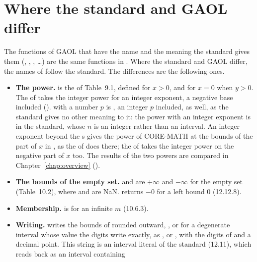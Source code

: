 \section{Where the standard and GAOL differ}\label{sec:ieee1788-differences}
%

The functions of GAOL that have the name and the meaning the standard gives
them (, , , \ldots) are the same
functions in . Where the standard and GAOL differ, the
names of  follow the standard. The differences are the
following ones.

\begin{itemize}
\item[$\bullet$] \textbf{The power.}  is the  of
  Table~9.1, defined for $x>0$, and for $x=0$ when $y>0$. The  of
   takes the integer power for an integer exponent, a negative
  base included ().  with a number $p$ is
  , an integer $p$ included,  as well, as
  the standard gives no other meaning to it: the power with an integer
  exponent is  in the standard, whose $n$ is an integer
  rather than an interval. An integer exponent beyond the s gives
  the power of CORE-MATH at the bounds of the part of $x$ in
  , as the  of  does there; the 
  of  takes the integer power on the negative part of $x$ too. The results of the two powers are
  compared in Chapter~\ref{chap:overview} ().
\item[$\bullet$] \textbf{The bounds of the empty set.}  and
   are $+\infty$ and $-\infty$ for the empty set (Table~10.2),
  where  and  are NaN.  returns $-0$
  for a left bound 0 (12.12.8).
\item[$\bullet$] \textbf{Membership.}  is 
  for an infinite $m$ (10.6.3).
\item[$\bullet$] \textbf{Writing.}  writes the
  bounds of  rounded outward, \code{[l, r]}, or \code{[a]} for a
  degenerate interval whose value the digits write exactly, as \code{[4]},
  or \code{[empty]}, with the digits of  and a
  decimal point. This string is an interval literal of the standard (12.11),
  which  reads back as an interval containing

\end{itemize}

